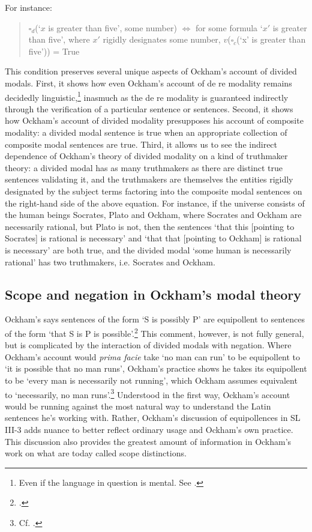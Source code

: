	For instance:
	\begin{quote}
		$\square_{d}$(`$x$ is greater than five', some number) $\Leftrightarrow$ for some formula `$x'$ is greater than five', where $x'$ rigidly designates some number, $v$($\square_{c}$(`x' is greater than five')) = True
	\end{quote}
	
	This condition preserves several unique aspects of Ockham's account of divided modals. First, it shows how even Ockham's account of de re modality remains decidedly linguistic,\footnote{Even if the language in question is mental. See \cite{Panaccio1999}.}  inasmuch as the de re modality is guaranteed indirectly through the verification of a particular sentence or sentences. Second, it shows how Ockham's account of divided modality presupposes his account of composite modality: a divided modal sentence is true when an appropriate collection of composite modal sentences are true. Third, it allows us to see the indirect dependence of Ockham's theory of divided modality on a kind of truthmaker theory: a divided modal has as many truthmakers as there are distinct true sentences validating it, and the truthmakers are themselves the entities rigidly designated by the subject terms factoring into the composite modal sentences on the right-hand side of the above equation. For instance, if the universe consists of the human beings Socrates, Plato and Ockham, where Socrates and Ockham are necessarily rational, but Plato is not, then the sentences `that this [pointing to Socrates] is rational is necessary' and `that that [pointing to Ockham] is rational is necessary' are both true, and the divided modal `some human is necessarily rational' has two truthmakers, i.e. Socrates and Ockham.
	\subsection{Scope and negation in Ockham's modal theory}
	Ockham's says sentences of the form `S is possibly P' are equipollent to sentences of the form `that S is P is possible'.\footnote{\cite[II. 9, p. 273; 10, p. 276]{OckhamSL}.} This comment, however, is not fully general, but is complicated by the interaction of divided modals with negation. Where Ockham's account would \textit{prima facie} take `no man can run' to be equipollent to `it is possible that no man runs', Ockham's practice shows he takes its equipollent to be `every man is necessarily not running', which Ockham assumes equivalent to `necessarily, no man runs'.\footnote{Cf. \cite[III-3. 14, p. 645; 36, p. 720]{OckhamSL}.} Understood in the first way, Ockham's account would be running against the most natural way to understand the Latin sentences he's working with. Rather, Ockham's discussion of equipollences in SL III-3 adds nuance to better reflect ordinary usage and Ockham's own practice. This discussion also provides the greatest amount of information in Ockham's work on what are today called scope distinctions.
	
